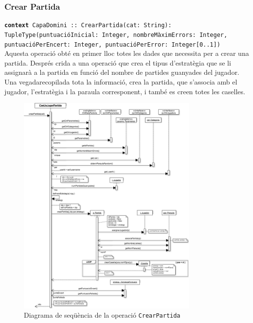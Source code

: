 \subsubsection{Crear Partida}
\small{\texttt{\textbf{context} CapaDomini :: CrearPartida(cat: String): TupleType(puntuacióInicial: Integer, nombreMàximErrors: Integer, puntuacióPerEncert: Integer, puntuacióPerError: Integer[0..1])
}}\\
Aquesta operació obté en primer lloc totes les dades que necessita per a crear una partida. Després crida a una operació que crea el tipus d'estratègia que se li assignarà a la partida en funció del nombre de partides guanyades del jugador. Una vegadarecopilada tota la informació, crea la partida, que s'associa amb el jugador, l'estratègia i la paraula corresponent, i també es creen totes les caselles.\\

    \begin{figure}[h!]
    \centering
    \includegraphics[width=0.8\textwidth]{figures/crearPartida.png}
    \caption{Diagrama de seqüència de la operació \texttt{CrearPartida}}
    \end{figure}



